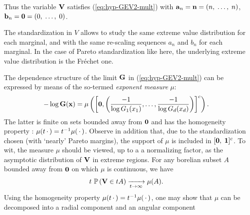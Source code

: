  Thus the variable $\mathbf V$ satisfies
(\ref{eq:hyp-GEV2-mult}) with $\mathbf a_n = \mathbf n = (n,\; \ldots,\; n)$, $\mathbf b_n =\mathbf 0 =(0,\; \ldots,\; 0)$. 

\begin{remark} %
The standardization in $V$ allows to study the same extreme value distribution for each marginal, and with the same re-scaling sequences $a_n$ and $b_n$ for each marginal. In the case of Pareto standardization like here, the underlying extreme value distribution is the Fréchet one.
\end{remark}

The dependence structure of the limit $\mathbf G$ in (\ref{eq:hyp-GEV2-mult})
can be expressed by means of the so-termed \textit{exponent measure} $\mu$: 
\begin{align}
- \log \mathbf G(\mathbf{x})= \mu\left( \left[ \mathbf 0, \left(\frac{-1}{\log G_1(x_1)}, \dots ,\frac{-1}{\log G_d(x_d)}\right)\right]^c\right). \nonumber
\end{align}
The latter  is finite on
sets bounded away from $\mathbf 0$ and has the
homogeneity property : $\mu(t\,\cdot\,) =
t^{-1}\mu(\,\cdot\,)$. Observe in addition that, due to the standardization chosen (with
`nearly' Pareto margins), the support of $\mu$ is included in $[\mathbf 0,\; \mathbf{1}]^c$. %
 To wit, the measure $\mu$ should be viewed, up to a a normalizing factor, as
the asymptotic distribution of $\mathbf V$ in extreme regions. For any borelian subset $A$ bounded away from $\mathbf 0$ on which $\mu$ is continuous, we have 
\begin{align}
\label{eq:regularVariation}
t~ \mathbb{P}\left( \mathbf V \in t A\right) \xrightarrow[t\to\infty]{}\mu(A).     
\end{align}
Using the homogeneity property $\mu(t\,\cdot\,) =
t^{-1}\mu(\,\cdot\,)$, one may show
that $\mu$  can be decomposed into a  radial component and an angular component
